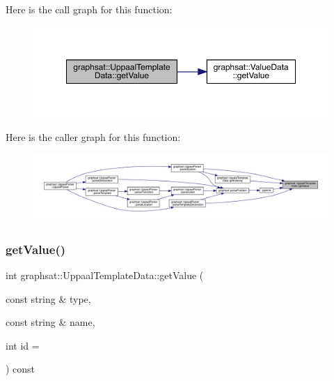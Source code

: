 Here is the call graph for this function\+:
\nopagebreak
\begin{figure}[H]
\begin{center}
\leavevmode
\includegraphics[width=350pt]{classgraphsat_1_1_uppaal_template_data_a72fc224f253fa49d0059cf81fe3f3d5d_cgraph}
\end{center}
\end{figure}
Here is the caller graph for this function\+:
\nopagebreak
\begin{figure}[H]
\begin{center}
\leavevmode
\includegraphics[width=350pt]{classgraphsat_1_1_uppaal_template_data_a72fc224f253fa49d0059cf81fe3f3d5d_icgraph}
\end{center}
\end{figure}
\mbox{\label{classgraphsat_1_1_uppaal_template_data_a984e6f2c3acbfa11b3ab974f64a62b94}} 
\subsubsection{\texorpdfstring{getValue()}{getValue()}\hspace{0.1cm}{\footnotesize\ttfamily [2/3]}}
{\footnotesize\ttfamily int graphsat\+::\+Uppaal\+Template\+Data\+::get\+Value (\begin{DoxyParamCaption}\item[{const string \&}]{type,  }\item[{const string \&}]{name,  }\item[{int}]{id = {} }\end{DoxyParamCaption}) const\hspace{0.3cm}{\ttfamily [inline]}}

